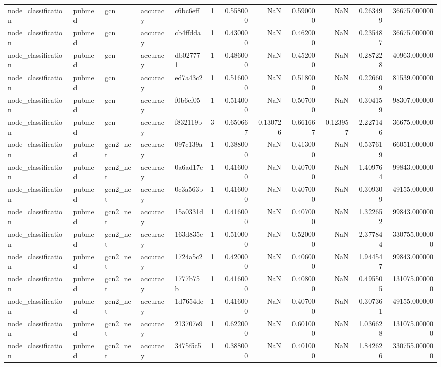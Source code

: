 \begin{tabular}{lllllrrrrrrr}
node_classification & pubmed & gcn & accuracy & c6bc6eff & 1 & 0.558000 & NaN & 0.590000 & NaN & 0.263499 & 36675.000000 \\
node_classification & pubmed & gcn & accuracy & cb4ffdda & 1 & 0.430000 & NaN & 0.462000 & NaN & 0.235487 & 36675.000000 \\
node_classification & pubmed & gcn & accuracy & db027771 & 1 & 0.486000 & NaN & 0.452000 & NaN & 0.287228 & 40963.000000 \\
node_classification & pubmed & gcn & accuracy & ed7a43c2 & 1 & 0.516000 & NaN & 0.518000 & NaN & 0.226609 & 81539.000000 \\
node_classification & pubmed & gcn & accuracy & f0b6ef05 & 1 & 0.514000 & NaN & 0.507000 & NaN & 0.304159 & 98307.000000 \\
node_classification & pubmed & gcn & accuracy & f832119b & 3 & 0.650667 & 0.130726 & 0.661667 & 0.123957 & 2.227146 & 36675.000000 \\
node_classification & pubmed & gcn2_net & accuracy & 097c139a & 1 & 0.388000 & NaN & 0.413000 & NaN & 0.537619 & 66051.000000 \\
node_classification & pubmed & gcn2_net & accuracy & 0a6ad17c & 1 & 0.416000 & NaN & 0.407000 & NaN & 1.409764 & 99843.000000 \\
node_classification & pubmed & gcn2_net & accuracy & 0c3a563b & 1 & 0.416000 & NaN & 0.407000 & NaN & 0.309309 & 49155.000000 \\
node_classification & pubmed & gcn2_net & accuracy & 15a0331d & 1 & 0.416000 & NaN & 0.407000 & NaN & 1.322652 & 99843.000000 \\
node_classification & pubmed & gcn2_net & accuracy & 163d835e & 1 & 0.510000 & NaN & 0.520000 & NaN & 2.377844 & 330755.000000 \\
node_classification & pubmed & gcn2_net & accuracy & 1724a5c2 & 1 & 0.420000 & NaN & 0.406000 & NaN & 1.944547 & 99843.000000 \\
node_classification & pubmed & gcn2_net & accuracy & 1777b75b & 1 & 0.416000 & NaN & 0.408000 & NaN & 0.495505 & 131075.000000 \\
node_classification & pubmed & gcn2_net & accuracy & 1d7654de & 1 & 0.416000 & NaN & 0.407000 & NaN & 0.307361 & 49155.000000 \\
node_classification & pubmed & gcn2_net & accuracy & 213707e9 & 1 & 0.622000 & NaN & 0.601000 & NaN & 1.036628 & 131075.000000 \\
node_classification & pubmed & gcn2_net & accuracy & 3475f5c5 & 1 & 0.388000 & NaN & 0.401000 & NaN & 1.842626 & 330755.000000 \\

\end{tabular}
